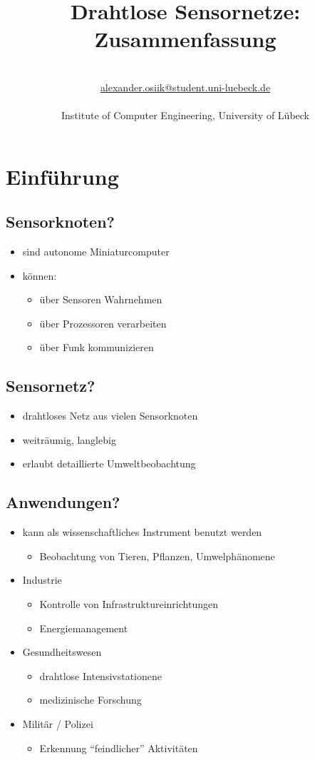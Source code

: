 \documentclass[a4paper]{article}
\title{\textbf{Drahtlose Sensornetze: Zusammenfassung}}\let\Title\@title
\author{\AuthorName\\
	\href{mailto:alexander.osiik@student.uni-luebeck.de}{alexander.osiik@student.uni-luebeck.de}\\
	\small \seminar\\
	\small Institute of Computer Engineering, University of L\"ubeck\\
}\let\Author\@author
\begin{document}
	\maketitle

\section{Einführung}
\subsection{Sensorknoten?}
\begin{itemize}
	\item sind autonome Miniaturcomputer
	\item können: \begin{itemize}
		\item über Sensoren Wahrnehmen
		\item über Prozessoren verarbeiten
		\item über Funk kommunizieren
	\end{itemize}
\end{itemize}
\subsection{Sensornetz?}
\begin{itemize}
	\item drahtloses Netz aus vielen Sensorknoten
	\item weiträumig, langlebig
	\item erlaubt detaillierte Umweltbeobachtung
\end{itemize}
\subsection{Anwendungen?}
\begin{itemize}
	\item kann als wissenschaftliches Instrument benutzt werden\begin{itemize}
		\item Beobachtung von Tieren, Pflanzen, Umwelphänomene
	\end{itemize}
	\item Industrie\begin{itemize}
		\item Kontrolle von Infrastruktureinrichtungen
		\item Energiemanagement
	\end{itemize}
	\item Gesundheitswesen\begin{itemize}
		\item drahtlose Intensivstationene
		\item medizinische Forschung
	\end{itemize}
	\item Militär / Polizei\begin{itemize}
		\item Erkennung ``feindlicher'' Aktivitäten
	\end{itemize}
\end{itemize}
\end{document}
